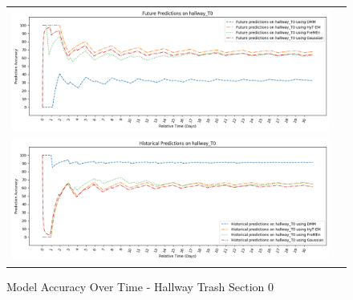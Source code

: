 \begin{center}
\begin{figure}[!Hp]
  \begin{tabular}{cc}
    {\includegraphics[width = 6in]{images/results/Future_Predictions_on_hallway_T0.png}} \\
    {\includegraphics[width = 6in]{images/results/Historical_Predictions_on_hallway_T0.png}} \\
  \end{tabular}
  \caption{Model Accuracy Over Time - Hallway Trash Section 0}
\end{figure}




\end{center}
